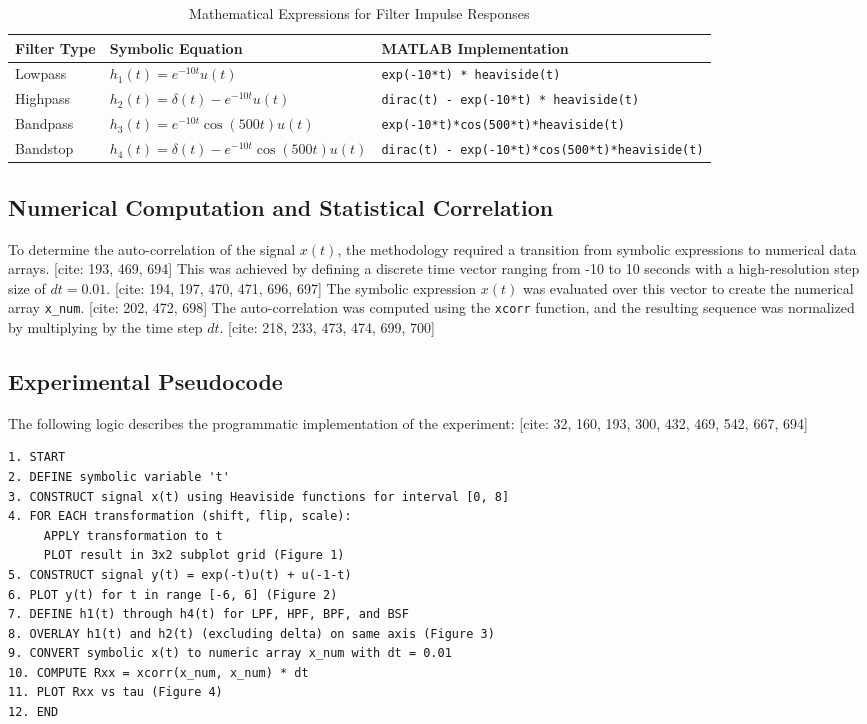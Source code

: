 \begin{table}[h]
\centering
\caption{Mathematical Expressions for Filter Impulse Responses}
\begin{tabular}{|l|l|l|}
\hline
\textbf{Filter Type} & \textbf{Symbolic Equation} & \textbf{MATLAB Implementation} \\ \hline
Lowpass & $h_1(t) = e^{-10t}u(t)$ & \texttt{exp(-10*t) * heaviside(t)} \\ \hline
Highpass & $h_2(t) = \delta(t) - e^{-10t}u(t)$ & \texttt{dirac(t) - exp(-10*t) * heaviside(t)} \\ \hline
Bandpass & $h_3(t) = e^{-10t}\cos(500t)u(t)$ & \texttt{exp(-10*t)*cos(500*t)*heaviside(t)} \\ \hline
Bandstop & $h_4(t) = \delta(t) - e^{-10t}\cos(500t)u(t)$ & \texttt{dirac(t) - exp(-10*t)*cos(500*t)*heaviside(t)} \\ \hline
\end{tabular}
\end{table}

\subsection{Numerical Computation and Statistical Correlation}
To determine the auto-correlation of the signal $x(t)$, the methodology required a transition from symbolic expressions to numerical data arrays. [cite: 193, 469, 694] This was achieved by defining a discrete time vector ranging from -10 to 10 seconds with a high-resolution step size of $dt = 0.01$. [cite: 194, 197, 470, 471, 696, 697] The symbolic expression $x(t)$ was evaluated over this vector to create the numerical array \texttt{x\_num}. [cite: 202, 472, 698] The auto-correlation was computed using the \texttt{xcorr} function, and the resulting sequence was normalized by multiplying by the time step $dt$. [cite: 218, 233, 473, 474, 699, 700]

\subsection{Experimental Pseudocode}
The following logic describes the programmatic implementation of the experiment: [cite: 32, 160, 193, 300, 432, 469, 542, 667, 694]

\begin{verbatim}
1. START
2. DEFINE symbolic variable 't'
3. CONSTRUCT signal x(t) using Heaviside functions for interval [0, 8]
4. FOR EACH transformation (shift, flip, scale):
     APPLY transformation to t
     PLOT result in 3x2 subplot grid (Figure 1)
5. CONSTRUCT signal y(t) = exp(-t)u(t) + u(-1-t)
6. PLOT y(t) for t in range [-6, 6] (Figure 2)
7. DEFINE h1(t) through h4(t) for LPF, HPF, BPF, and BSF
8. OVERLAY h1(t) and h2(t) (excluding delta) on same axis (Figure 3)
9. CONVERT symbolic x(t) to numeric array x_num with dt = 0.01
10. COMPUTE Rxx = xcorr(x_num, x_num) * dt
11. PLOT Rxx vs tau (Figure 4)
12. END
\end{verbatim}
